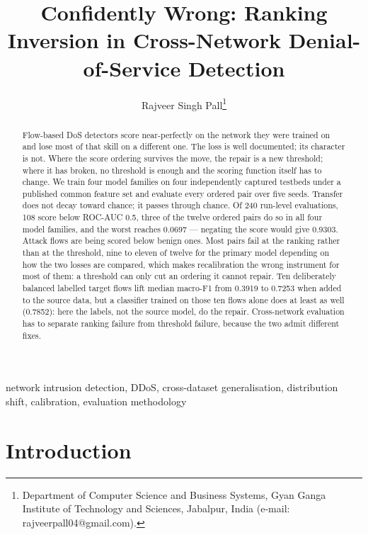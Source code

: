\documentclass[journal]{IEEEtran}
\begin{document}
\title{Confidently Wrong: Ranking Inversion in Cross-Network Denial-of-Service Detection}
\author{Rajveer Singh Pall\thanks{Department of Computer Science and Business Systems, Gyan Ganga Institute of Technology and Sciences, Jabalpur, India (e-mail: rajveerpall04@gmail.com).}}

\maketitle

\begin{abstract}
Flow-based DoS detectors score near-perfectly on the network they were trained on and lose most of that skill on a different one. The loss is well documented; its character is not. Where the score ordering survives the move, the repair is a new threshold; where it has broken, no threshold is enough and the scoring function itself has to change. We train four model families on four independently captured testbeds under a published common feature set and evaluate every ordered pair over five seeds. Transfer does not decay toward chance; it passes through chance. Of 240 run-level evaluations, 108 score below ROC-AUC 0.5, three of the twelve ordered pairs do so in all four model families, and the worst reaches 0.0697 --- negating the score would give 0.9303. Attack flows are being scored below benign ones. Most pairs fail at the ranking rather than at the threshold, nine to eleven of twelve for the primary model depending on how the two losses are compared, which makes recalibration the wrong instrument for most of them: a threshold can only cut an ordering it cannot repair. Ten deliberately balanced labelled target flows lift median macro-F1 from 0.3919 to 0.7253 when added to the source data, but a classifier trained on those ten flows alone does at least as well (0.7852): here the labels, not the source model, do the repair. Cross-network evaluation has to separate ranking failure from threshold failure, because the two admit different fixes.
\end{abstract}

\begin{IEEEkeywords}
network intrusion detection, DDoS, cross-dataset generalisation, distribution shift, calibration, evaluation methodology
\end{IEEEkeywords}



\section{Introduction}
\end{document}
